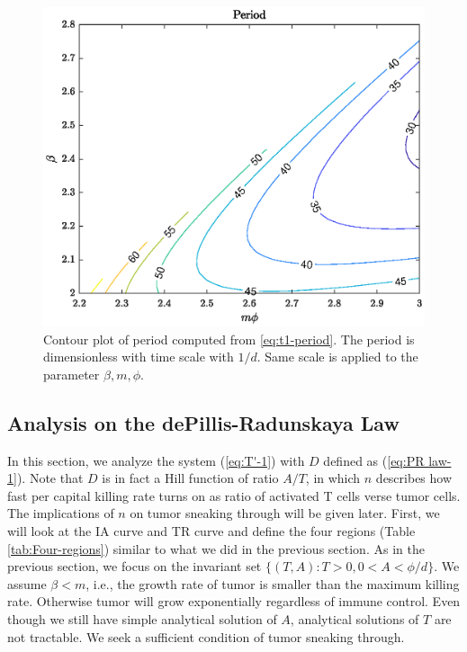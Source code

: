 \documentclass[review,authoryear]{elsarticle}
\begin{document}
\begin{figure}
\includegraphics[width=0.9\linewidth]{figs/DA-period-contour}

\caption{\label{fig:Contour-plot-of-period}Contour plot of period computed
from \ref{eq:t1-period}. The period is dimensionless with time scale
with $1/d$. Same scale is applied to the parameter $\beta,m,\phi$. }

\end{figure}


\subsection{Analysis on the dePillis-Radunskaya Law}

In this section, we analyze the system (\ref{eq:T'-1}) with $D$
defined as (\ref{eq:PR law-1}). Note that $D$ is in fact a Hill
function of ratio $A/T$, in which $n$ describes how fast per capital
killing rate turns on as ratio of activated T cells verse tumor cells.
The implications of $n$ on tumor sneaking through will be given later.
First, we will look at the IA curve and TR curve and define the four
regions (Table \ref{tab:Four-regions}) similar to what we did in
the previous section. As in the previous section, we focus on the
invariant set $\{(T,A):T>0,0<A<\phi/d\}$. We assume $\beta<m$, i.e.,
the growth rate of tumor is smaller than the maximum killing rate.
Otherwise tumor will grow exponentially regardless of immune control.
Even though we still have simple analytical solution of $A$, analytical
solutions of $T$ are not tractable. We seek a sufficient condition
of tumor sneaking through. 
\end{document}
